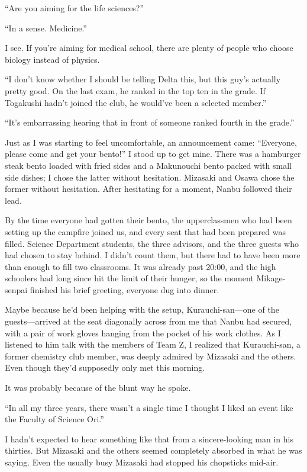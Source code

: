 \documentclass[
    a4paper,
    12pt,
    twoside,
    openany,
    UTF8,
    fontset=windows
]{ctexbook}
\begin{document}
``Are you aiming for the life sciences?''

``In a sense. Medicine.''

I see. If you're aiming for medical school, there are plenty of people who choose biology instead of physics.

``I don't know whether I should be telling Delta this, but this guy's actually pretty good. On the last exam, he ranked in the top ten in the grade. If Togakushi hadn't joined the club, he would've been a selected member.''

``It's embarrassing hearing that in front of someone ranked fourth in the grade.''

Just as I was starting to feel uncomfortable, an announcement came: ``Everyone, please come and get your bento!'' I stood up to get mine. There was a hamburger steak bento loaded with fried sides and a Makunouchi bento packed with small side dishes; I chose the latter without hesitation. Mizasaki and Osawa chose the former without hesitation. After hesitating for a moment, Nanbu followed their lead.

By the time everyone had gotten their bento, the upperclassmen who had been setting up the campfire joined us, and every seat that had been prepared was filled. Science Department students, the three advisors, and the three guests who had chosen to stay behind. I didn't count them, but there had to have been more than enough to fill two classrooms. It was already past 20:00, and the high schoolers had long since hit the limit of their hunger, so the moment Mikage-senpai finished his brief greeting, everyone dug into dinner.

Maybe because he'd been helping with the setup, Kurauchi-san---one of the guests---arrived at the seat diagonally across from me that Nanbu had secured, with a pair of work gloves hanging from the pocket of his work clothes. As I listened to him talk with the members of Team Z, I realized that Kurauchi-san, a former chemistry club member, was deeply admired by Mizasaki and the others. Even though they'd supposedly only met this morning.

It was probably because of the blunt way he spoke.

``In all my three years, there wasn't a single time I thought I liked an event like the Faculty of Science Ori.''

I hadn't expected to hear something like that from a sincere-looking man in his thirties. But Mizasaki and the others seemed completely absorbed in what he was saying. Even the usually busy Mizasaki had stopped his chopsticks mid-air.
\end{document}
